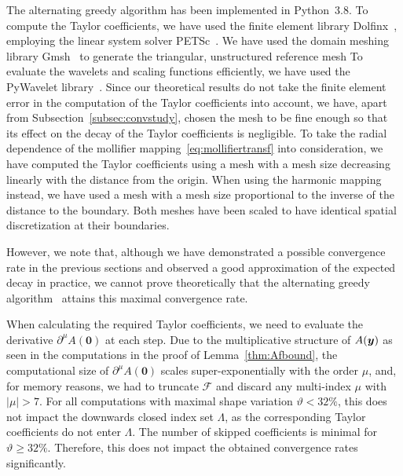 The alternating greedy algorithm has been implemented in Python~3.8.
To compute the Taylor coefficients, we have used the finite element library Dolfinx~\cite{alnaes2014a,baratta2023,scroggs2022,scroggs2022a}, employing the linear system solver PETSc~\cite{brown2022,dalcin2011}.
We have used the domain meshing library Gmsh~\cite{geuzaine2009} to generate the triangular, unstructured reference mesh 
To evaluate the wavelets and scaling functions efficiently, we have used the PyWavelet library~\cite{lee2019}.
Since our theoretical results do not take the finite element error in the computation of the Taylor coefficients into account, we have, apart from Subsection~\ref{subsec:convstudy}, chosen the mesh to be fine enough so that its effect on the decay of the Taylor coefficients is negligible.
To take the radial dependence of the mollifier mapping~\eqref{eq:mollifiertransf} into consideration, we have computed the Taylor coefficients using a mesh with a mesh size decreasing linearly with the distance from the origin.
When using the harmonic mapping instead, we have used a mesh with a mesh size proportional to the inverse of the distance to the boundary.
Both meshes have been scaled to have identical spatial discretization at their boundaries.

However, we note that, although we have demonstrated a possible convergence rate in the previous sections and observed a good approximation of the expected decay in practice, we cannot prove theoretically that the alternating greedy algorithm~\cite{cohen2015} attains this maximal convergence rate.

When calculating the required Taylor coefficients, we need to evaluate the derivative $\partial^\mu A(\bm{0})$ at each step.
Due to the multiplicative structure of $A({\bm{y}})$ as seen in the computations in the proof of Lemma~\ref{thm:Afbound}, the computational size of $\partial^\mu A(\bm{0})$  scales super-exponentially with the order $\mu$, and, for memory reasons, we had to truncate $\mathcal{F}$ and discard any multi-index $\mu$ with $|\mu| > 7$.
For all computations with maximal shape variation $\vartheta < 32\%$, this does not impact the downwards closed index set $\Lambda$, as the corresponding Taylor coefficients do not enter $\Lambda$.
The number of skipped coefficients is minimal for $\vartheta \geq 32\%$.
Therefore, this does not impact the obtained convergence rates significantly.

